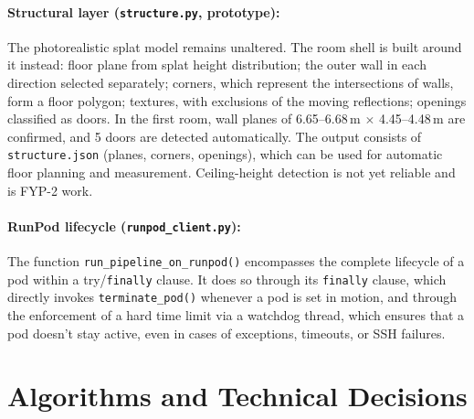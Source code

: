 \paragraph{Structural layer (\texttt{structure.py}, prototype):} The photorealistic splat model remains unaltered. The room shell is built around it instead: floor plane from splat height distribution; the outer wall in each direction selected separately; corners, which represent the intersections of walls, form a floor polygon; textures, with exclusions of the moving reflections; openings classified as doors. In the first room, wall planes of 6.65--6.68\,m $\times$ 4.45--4.48\,m are confirmed, and 5 doors are detected automatically. The output consists of \texttt{structure.json} (planes, corners, openings), which can be used for automatic floor planning and measurement. Ceiling-height detection is not yet reliable and is FYP-2 work.

\paragraph{RunPod lifecycle (\texttt{runpod\_client.py}):} The function \texttt{run\_pipeline\_on\_runpod()} encompasses the complete lifecycle of a pod within a try/\texttt{finally} clause. It does so through its \texttt{finally} clause, which directly invokes \texttt{terminate\_pod()} whenever a pod is set in motion, and through the enforcement of a hard time limit via a watchdog thread, which ensures that a pod doesn't stay active, even in cases of exceptions, timeouts, or SSH failures.

\section{Algorithms and Technical Decisions}

